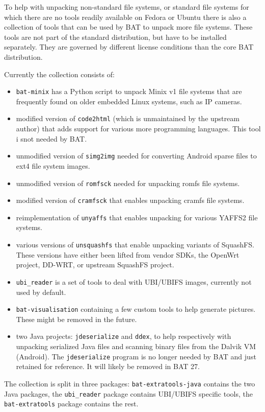 \documentclass[10pt,a4paper]{article}
\begin{document}
To help with unpacking non-standard file systems, or standard file systems for
which there are no tools readily available on Fedora or Ubuntu there is also
a collection of tools that can be used by BAT to unpack more file systems.
These tools are not part of the standard distribution, but have to be installed
separately. They are governed by different license conditions than the core BAT
distribution.

Currently the collection consists of:

\begin{itemize}
\item \texttt{bat-minix} has a Python script to unpack Minix v1 file systems
that are frequently found on older embedded Linux systems, such as IP cameras.
\item modified version of \texttt{code2html} (which is unmaintained by the
upstream author) that adds support for various more programming languages.
This tool i snot needed by BAT.
\item unmodified version of \texttt{simg2img} needed for converting Android
sparse files to ext4 file system images.
\item unmodified version of \texttt{romfsck} needed for unpacking romfs file
systems.
\item modified version of \texttt{cramfsck} that enables unpacking cramfs
file systems.
\item reimplementation of \texttt{unyaffs} that enables unpacking for various
YAFFS2 file systems.
\item various versions of \texttt{unsquashfs} that enable unpacking variants
of SquashFS. These versions have either been lifted from vendor SDKs, the
OpenWrt project, DD-WRT, or upstream SquashFS project.
\item \texttt{ubi\_reader} is a set of tools to deal with UBI/UBIFS images,
currently not used by default.
\item \texttt{bat-visualisation} containing a few custom tools to help generate
pictures. These might be removed in the future.
\item two Java projects: \texttt{jdeserialize} and \texttt{ddex}, to help
respectively with unpacking serialized Java files and scanning binary files
from the Dalvik VM (Android). The \texttt{jdeserialize} program is no longer
needed by BAT and just retained for reference. It will likely be removed in
BAT 27.
\end{itemize}

The collection is split in three packages: \texttt{bat-extratools-java} contains
the two Java packages, the \texttt{ubi\_reader} package contains UBI/UBIFS
specific tools, the \texttt{bat-extratools} package contains the rest.
\end{document}
